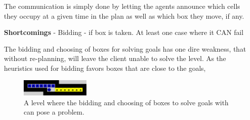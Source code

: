 \documentclass[Main]{subfiles}
\begin{document}
The communication is simply done by letting the agents announce which cells they occupy at a given time in the plan as well as which box they move, if any. 



\textbf{Shortcomings}
- Bidding - if box is taken. At least one case where it CAN fail

The bidding and choosing of boxes for solving goals has one dire weakness, that without re-planning, will leave the client unable to solve the level. As the heuristics used for bidding favors boxes that are close to the goals,


\begin{figure}[h!]
    \centering
    \includegraphics[width=0.3\textwidth]{shortcomings.png}
    \caption{A level where the bidding and choosing of boxes to solve goals with can pose a problem.}
    \label{fig:shortcomings}
\end{figure}

\end{document}
